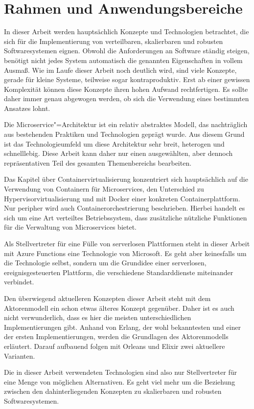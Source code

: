 \section{Rahmen und Anwendungsbereiche}

In dieser Arbeit werden hauptsächlich Konzepte und Technologien betrachtet, die sich für die Implementierung von verteilbaren, skalierbaren und robusten Softwaresystemen eignen. Obwohl die Anforderungen an Software ständig steigen, benötigt nicht jedes System automatisch die genannten Eigenschaften in vollem Ausmaß. Wie im Laufe dieser Arbeit noch deutlich wird, sind viele Konzepte, gerade für kleine Systeme, teilweise sogar kontraproduktiv. Erst ab einer gewissen Komplexität können diese Konzepte ihren hohen Aufwand rechtfertigen. Es sollte daher immer genau abgewogen werden, ob sich die Verwendung eines bestimmten Ansatzes lohnt.

Die Microservice"=Architektur ist ein relativ abstraktes Modell, das nachträglich aus bestehenden Praktiken und Technologien geprägt wurde. Aus diesem Grund ist das Technologieumfeld um diese Architektur sehr breit, heterogen und schnelllebig. Diese Arbeit kann daher nur einen ausgewählten, aber dennoch repräsentativen Teil des gesamten Themenbereichs bearbeiten.

Das Kapitel über Containervirtualisierung konzentriert sich hauptsächlich auf die Verwendung von Containern für Microservices, den Unterschied zu Hypervisorvirtualisierung und mit Docker einer konkreten Containerplattform. Nur peripher wird auch Containerorchestrierung beschrieben. Hierbei handelt es sich um eine Art verteiltes Betriebssystem, dass zusätzliche nützliche Funktionen für die Verwaltung von Microservices bietet.

Als Stellvertreter für eine Fülle von serverlosen Plattformen steht in dieser Arbeit mit Azure Functions eine Technologie von Microsoft. Es geht aber keinesfalls um die Technologie selbst, sondern um die Grundidee einer serverlosen, ereignisgesteuerten Plattform, die verschiedene Standarddienste miteinander verbindet.

Den überwiegend aktuelleren Konzepten dieser Arbeit steht mit dem Aktorenmodell ein schon etwas älteres Konzept gegenüber. Daher ist es auch nicht verwunderlich, dass es hier die meisten unterschiedlichen Implementierungen gibt. Anhand von Erlang, der wohl bekanntesten und einer der ersten Implementierungen, werden die Grundlagen des Aktorenmodells erläutert. Darauf aufbauend folgen mit Orleans und Elixir zwei aktuellere Varianten.

Die in dieser Arbeit verwendeten Technologien sind also nur Stellvertreter für eine Menge von möglichen Alternativen. Es geht viel mehr um die Beziehung zwischen den dahinterliegenden Konzepten zu skalierbaren und robusten Softwaresystemen.